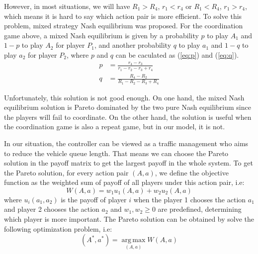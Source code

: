 \documentclass[a4paper, 10pt, conference]{ieeeconf}      %
\DeclareMathOperator*{\argmax}{arg\,max}
\begin{document}
However, in most situations, we will have $R_1>R_4$, $r_1<r_4$ or $R_1<R_4$, $r_1>r_4$, which means it is hard to say which action pair is more
efficient. To solve this problem, mixed strategy Nash equilibrium was proposed. For the coordination game above, a mixed Nash equilibrium is given by 
a probability $p$ to play $A_1$ and $1-p$ to play $A_2$ for player $P_1$, and another probability $q$ to play $a_1$ and $1-q$ to play $a_2$ for player 
$P_2$, where $p$ and $q$ can be caculated as (\ref{eq:p}) and (\ref{eq:q}).
\begin{align}
        \label{eq:p}
        p&=\frac{r_4-r_3}{r_1-r_2-r_3+r_4}\\
        \label{eq:q}
        q&=\frac{R_4-R_2}{R_1-R_2-R_3+R_4}
\end{align}

Unfortunately, this solution is not good enough. On one hand, the mixed Nash equilibrium solution is Pareto dominated by the two pure Nash equilibrium since 
the players will fail to coordinate. On the other hand, the solution is useful when the coordination game is also a repeat game, but in our model, it is not. 

In our situation, the controller can be viewed as a traffic management who aims to reduce the vehicle queue length. That means we can choose the 
Pareto solution in the payoff matrix to get the largest payoff in the whole system. To get the Pareto solution, for every action pair $(A,a)$, we 
define the objective function as the weighted sum of payoff of all players under this action pair, i.e:
\begin{equation}
        W(A,a)=w_1u_1(A,a)+w_2u_2(A,a)
\end{equation}
where $u_i(a_1,a_2)$ is the payoff of player $i$ when the player 1 chooses the action $a_1$ and player 2 chooses the action $a_2$ 
and $w_1,w_2\ge 0$ are predefined, determining which player is more important. The Pareto solution can be obtained by solve 
the following optimization problem, i.e:
\begin{equation}
        \label{eq:op}
        (A^*,a^*)=\argmax\limits_{(A,a)} W(A,a)
\end{equation}
\end{document}
